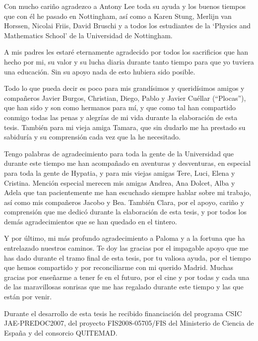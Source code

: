 \medskip

Con mucho cari\~no agradezco a Antony Lee toda su ayuda y los buenos tiempos que con \'el he pasado en Nottingham, as\'i como a Karen Stung, Merlijn van Horssen, Nicolai Friis, David Bruschi y a todos los estudiantes de la `Physics and Mathematics School' de la Universidad de Nottingham. 

\medskip

A mis padres les estar\'e eternamente agradecido por todos los sacrificios que han hecho por mi, su valor y su lucha diaria durante tanto tiempo para que yo tuviera una educaci\'on. Sin su apoyo nada de esto hubiera sido posible. 

\medskip

Todo lo que pueda decir es poco para mis grand\'isimos y querid\'isimos amigos y compa\~neros Javier Burgos, Christian, Diego, Pablo y Javier  Cu\'ellar (``Plocas''), que han sido y son como hermanos para m\'i, y que como tal han compartido conmigo todas las penas y alegr\'ias de mi vida durante la elaboraci\'on de esta tesis. Tambi\' en para mi vieja amiga Tamara, que sin dudarlo me ha prestado su sabidur\'ia y su comprensi\'on cada vez que la he necesitado.
\medskip

Tengo palabras de agradecimiento para toda la gente de la Universidad que durante este tiempo me han acompa\~nado en aventuras y desventuras, en especial para toda la gente de Hypatia, y para mis viejas amigas Tere, Luci, Elena y Cristina. Menci\'on especial merecen mis amigas Andrea, Ana Dolcet, Alba y Adela  que tan pacientemente me han escuchado siempre hablar sobre mi trabajo, as\'i como mis compa\~neros Jacobo y Bea. Tambi\'en Clara, por el apoyo, cari\~no y comprensi\'on que me dedic\'o durante la elaboraci\'on de esta tesis, y por todos los dem\'as agradecimientos que se han quedado en el tintero.

\medskip

Y por \'ultimo, mi m\'as profundo agradecimiento a Paloma y a la fortuna que ha entrelazado nuestros caminos. Te doy las gracias por el impagable apoyo que me has dado durante el tramo final de esta tesis, por tu valiosa ayuda, por el tiempo que hemos compartido y por reconciliarme con mi querido Madrid. Muchas gracias por ense\~narme a tener fe en el futuro, por el cine y por todas y cada una de las maravillosas sonrisas que me has regalado durante este tiempo y las que est\'an por venir. 

\medskip

 Durante el desarrollo de esta tesis he recibido financiaci\'on del programa CSIC JAE-PREDOC2007, del proyecto FIS2008-05705/FIS  del Ministerio de Ciencia de Espa\~na y del consorcio QUITEMAD.
 

